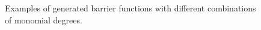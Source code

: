 \begin{figure}[H]
%
%
\hspace{1mm}
%
%
\caption{Examples of generated barrier functions with different combinations of monomial degrees.}
\end{figure}